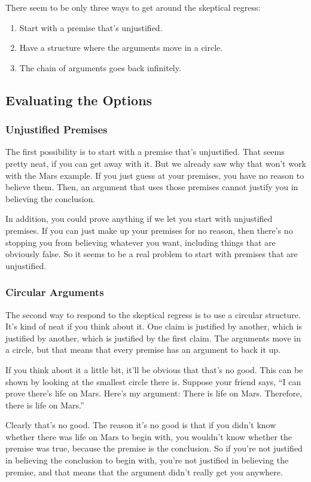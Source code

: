 \documentclass[12pt]{article}
\begin{document}
There seem to be only three ways to get around the skeptical regress:
\begin{enumerate}
    \item Start with a premise that's unjustified.
    \item Have a structure where the arguments move in a circle.
    \item The chain of arguments goes back infinitely.
\end{enumerate}

\subsection{Evaluating the Options}

\subsubsection{Unjustified Premises}
The first possibility is to start with a premise that's unjustified. That seems pretty neat, if you can get away with it. But we already saw why that won't work with the Mars example. If you just guess at your premises, you have no reason to believe them. Then, an argument that uses those premises cannot justify you in believing the conclusion.

In addition, you could prove anything if we let you start with unjustified premises. If you can just make up your premises for no reason, then there's no stopping you from believing whatever you want, including things that are obviously false. So it seems to be a real problem to start with premises that are unjustified.

\subsubsection{Circular Arguments}
The second way to respond to the skeptical regress is to use a circular structure. It's kind of neat if you think about it. One claim is justified by another, which is justified by another, which is justified by the first claim. The arguments move in a circle, but that means that every premise has an argument to back it up.

If you think about it a little bit, it'll be obvious that that's no good. This can be shown by looking at the smallest circle there is. Suppose your friend says, ``I can prove there's life on Mars. Here's my argument: There is life on Mars. Therefore, there is life on Mars.''

Clearly that's no good. The reason it's no good is that if you didn't know whether there was life on Mars to begin with, you wouldn't know whether the premise was true, because the premise is the conclusion. So if you're not justified in believing the conclusion to begin with, you're not justified in believing the premise, and that means that the argument didn't really get you anywhere.
\end{document}
